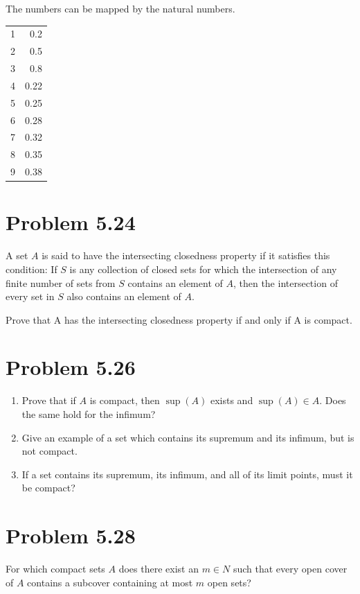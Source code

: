 \documentclass[12pt]{report}
\begin{document}
        The numbers can be mapped by the natural numbers.
        \begin{tabular}{| l | r |}
            1 & 0.2\\
            2 & 0.5\\
            3 & 0.8\\
            4 & 0.22\\
            5 & 0.25\\
            6 & 0.28\\
            7 & 0.32\\
            8 & 0.35\\
            9 & 0.38
        \end{tabular}
        
\pagebreak

\section{Problem 5.24}
    A set $A$ is said to have the intersecting closedness property if it satisfies this condition: 
    If $S$ is any collection of closed sets for which the intersection of any finite number of sets from $S$ contains an element of $A$, then the intersection of every set in $S$ also contains an element of $A$. 
    
    Prove that A has the intersecting closedness property if and only if A is compact.

\section{Problem 5.26}
    \begin{enumerate}[label=(\alph*)]
        \item   Prove that if $A$ is compact, then $\sup(A)$ exists and $\sup(A) \in A$. Does the same hold for the infimum? 
        \item   Give an example of a set which contains its supremum and its infimum, but is not compact. 
        \item   If a set contains its supremum, its infimum, and all of its limit points, must it be compact? 
    \end{enumerate}

\section{Problem 5.28}
    For which compact sets $A$ does there exist an $m \in N$ such that every open cover of $A$ contains a subcover containing at most $m$ open sets? 
\end{document}
